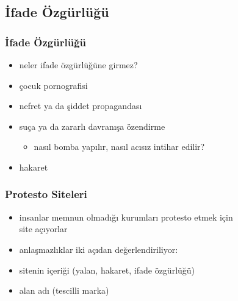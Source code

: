 \documentclass[dvipsnames]{beamer}
\theoremstyle{plain}
\begin{document}
\subsection{İfade Özgürlüğü}

\begin{frame}
  \frametitle{İfade Özgürlüğü}

  \begin{itemize}
    \item neler ifade özgürlüğüne girmez?

    \bigskip
    \item çocuk pornografisi
    \item nefret ya da şiddet propagandası
    \item suça ya da zararlı davranışa özendirme
    \begin{itemize}
      \item nasıl bomba yapılır, nasıl acısız intihar edilir?
    \end{itemize}
    \item hakaret
  \end{itemize}
\end{frame}

\begin{frame}
  \frametitle{Protesto Siteleri}

  \begin{itemize}
    \item insanlar memnun olmadığı kurumları protesto etmek için\\
      site açıyorlar

    \bigskip
    \item anlaşmazlıklar iki açıdan değerlendiriliyor:
    \smallskip
    \item sitenin içeriği (yalan, hakaret, ifade özgürlüğü)
    \item alan adı (tescilli marka)
  \end{itemize}
\end{frame}
\end{document}
